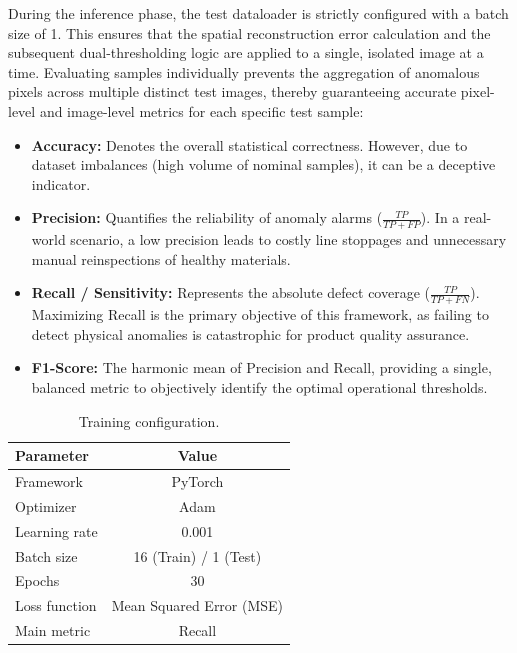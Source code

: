 \documentclass[10pt,twocolumn,a4paper]{article}
\begin{document}
During the inference phase, the test dataloader is strictly configured with a batch size of 1. This ensures that the spatial reconstruction error calculation and the subsequent dual-thresholding logic are applied to a single, isolated image at a time. Evaluating samples individually prevents the aggregation of anomalous pixels across multiple distinct test images, thereby guaranteeing accurate pixel-level and image-level metrics for each specific test sample:
\begin{itemize}
    \item \textbf{Accuracy:} Denotes the overall statistical correctness. However, due to dataset imbalances (high volume of nominal samples), it can be a deceptive indicator.
    \item \textbf{Precision:} Quantifies the reliability of anomaly alarms ($\frac{TP}{TP + FP}$). In a real-world scenario, a low precision leads to costly line stoppages and unnecessary manual reinspections of healthy materials.
    \item \textbf{Recall / Sensitivity:} Represents the absolute defect coverage ($\frac{TP}{TP + FN}$). Maximizing Recall is the primary objective of this framework, as failing to detect physical anomalies is catastrophic for product quality assurance.
    \item \textbf{F1-Score:} The harmonic mean of Precision and Recall, providing a single, balanced metric to objectively identify the optimal operational thresholds.
\end{itemize}


\begin{table}[h]
    \centering
    \caption{Training configuration.}
    \label{tab:training}
    \begin{tabular}{lc}
        \toprule
        \textbf{Parameter} & \textbf{Value} \\
        \midrule
        Framework & PyTorch \\
        Optimizer & Adam \\
        Learning rate & 0.001 \\
        Batch size & 16 (Train) / 1 (Test) \\
        Epochs & 30 \\
        Loss function & Mean Squared Error (MSE) \\
        Main metric & Recall \\
        \bottomrule
    \end{tabular}
\end{table}
\end{document}
